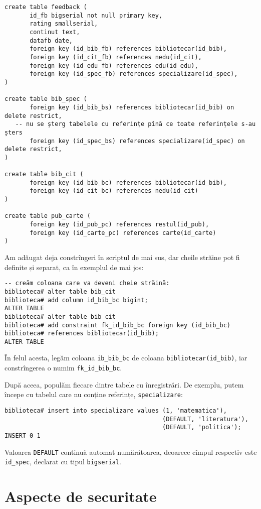 \begin{verbatim}
create table feedback (
	   id_fb bigserial not null primary key,
	   rating smallserial,
	   continut text,
	   datafb date,
	   foreign key (id_bib_fb) references bibliotecar(id_bib),
	   foreign key (id_cit_fb) references nedu(id_cit),
	   foreign key (id_edu_fb) references edu(id_edu),
	   foreign key (id_spec_fb) references specializare(id_spec),
)

create table bib_spec (
	   foreign key (id_bib_bs) references bibliotecar(id_bib) on delete restrict,
   -- nu se șterg tabelele cu referințe pînă ce toate referințele s-au șters
	   foreign key (id_spec_bs) references specializare(id_spec) on delete restrict,
)

create table bib_cit (
	   foreign key (id_bib_bc) references bibliotecar(id_bib),
	   foreign key (id_cit_bc) references nedu(id_cit)
)

create table pub_carte (
	   foreign key (id_pub_pc) references restul(id_pub),
	   foreign key (id_carte_pc) references carte(id_carte)
)
\end{verbatim}

Am adăugat deja constrîngeri în scriptul de mai sus, dar cheile străine
pot fi definite și separat, ca în exemplul de mai jos:

\begin{verbatim}
-- creăm coloana care va deveni cheie străină:
biblioteca# alter table bib_cit
biblioteca# add column id_bib_bc bigint;
ALTER TABLE
biblioteca# alter table bib_cit
biblioteca# add constraint fk_id_bib_bc foreign key (id_bib_bc) 
biblioteca# references bibliotecar(id_bib);
ALTER TABLE
\end{verbatim}

În felul acesta, legăm coloana \texttt{ib\_bib\_bc} de coloana \texttt{bibliotecar(id\_bib)},
iar constrîngerea o numim \texttt{fk\_id\_bib\_bc}.

După aceea, populăm fiecare dintre tabele cu înregistrări. De exemplu,
putem începe cu tabelul care nu conține referințe, \texttt{specializare}:

\begin{verbatim}
biblioteca# insert into specializare values (1, 'matematica'), 
                                            (DEFAULT, 'literatura'),
                                            (DEFAULT, 'politica');
INSERT 0 1
\end{verbatim}

Valoarea \texttt{DEFAULT} continuă automat numărătoarea, deoarece
cîmpul respectiv este \texttt{id\_spec}, declarat cu tipul \texttt{bigserial}.


\section{Aspecte de securitate}



